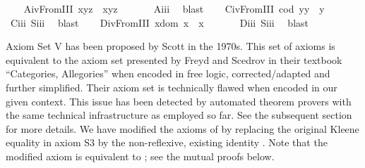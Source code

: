 \begin{isabellebody}
\ \ \isamarkupfalse%
\ A\isactrlsub i\isactrlsub vFromIII{\isacharcolon}\ {\isachardoublequoteopen}x{\isasymcdot}{\isacharparenleft}y{\isasymcdot}z{\isacharparenright}\ {\isasymcong}\ {\isacharparenleft}x{\isasymcdot}y{\isacharparenright}{\isasymcdot}z{\isachardoublequoteclose}\ \isanewline
%
\isadelimproof
\ \ \ \ %
\endisadelimproof
%
\isatagproof
{}\isamarkupfalse%
\ A\isactrlsub i\isactrlsub i\isactrlsub i\ \isamarkupfalse%
\ blast%
\endisatagproof
{\isafoldproof}%
%
\isadelimproof
\isanewline
%
\endisadelimproof
\ \ \isamarkupfalse%
\ C\isactrlsub i\isactrlsub vFromIII{\isacharcolon}\ {\isachardoublequoteopen}{\isacharparenleft}cod\ y{\isacharparenright}{\isasymcdot}y\ {\isasymcong}\ y{\isachardoublequoteclose}\ \isanewline
%
\isadelimproof
\ \ \ \ %
\endisadelimproof
%
\isatagproof
{}\isamarkupfalse%
\ C\isactrlsub i\isactrlsub i\isactrlsub i\ S\isactrlsub i\isactrlsub i\isactrlsub i\ \isamarkupfalse%
\ blast%
\endisatagproof
{\isafoldproof}%
%
\isadelimproof
\isanewline
%
\endisadelimproof
\ \ \isamarkupfalse%
\ D\isactrlsub i\isactrlsub vFromIII{\isacharcolon}\ {\isachardoublequoteopen}x{\isasymcdot}{\isacharparenleft}dom\ x{\isacharparenright}\ {\isasymcong}\ x{\isachardoublequoteclose}\ \isanewline
%
\isadelimproof
\ \ \ \ %
\endisadelimproof
%
\isatagproof
{}\isamarkupfalse%
\ D\isactrlsub i\isactrlsub i\isactrlsub i\ S\isactrlsub i\isactrlsub i\isactrlsub i\ \isamarkupfalse%
\ blast%
\endisatagproof
{\isafoldproof}%
%
\isadelimproof
%
\endisadelimproof
%
\isamarkuptrue%
%
\begin{isamarkuptext}%
Axiom Set V has been proposed by Scott \cite{Scott79} in the 1970s. This set of
 axioms is equivalent to the axiom set presented by Freyd and Scedrov in their textbook
 ``Categories, Allegories'' \cite{FreydScedrov90} when encoded in free logic, corrected/adapted and further simplified. 
 Their axiom set is technically flawed when encoded in our given context. This issue has been detected by automated theorem provers
 with the same technical infrastructure as employed so far. See the subsequent section  
 for more details. 
 We have modified the axioms of \cite{FreydScedrov90} by replacing the original Kleene 
 equality \isa{{\isasymcong}} in axiom S3 by the
 non-reflexive, existing identity \isa{{\isasymsimeq}}. Note that the modified axiom  is equivalent to ;
 see the mutual proofs below.%

\end{isamarkuptext}
\end{isabellebody}
